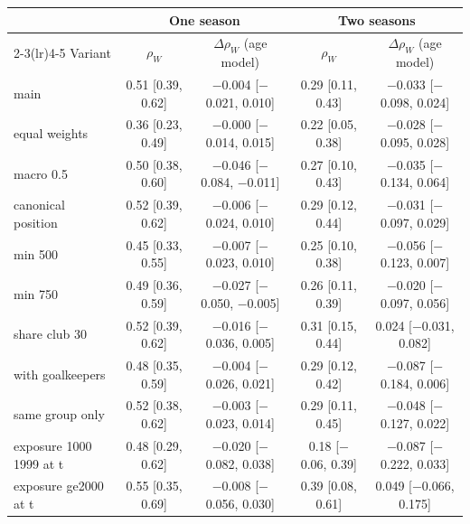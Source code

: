 \begin{tabular}{lcccc}
\toprule
 & \multicolumn{2}{c}{One season} & \multicolumn{2}{c}{Two seasons} \\
\cmidrule(lr){2-3}\cmidrule(lr){4-5}
Variant & $\rho_W$ & $\Delta\rho_W$ (age model) & $\rho_W$ & $\Delta\rho_W$ (age model) \\
\midrule
main & 0.51 [0.39, 0.62] & $-$0.004 [$-$0.021, 0.010] & 0.29 [0.11, 0.43] & $-$0.033 [$-$0.098, 0.024] \\
equal weights & 0.36 [0.23, 0.49] & $-$0.000 [$-$0.014, 0.015] & 0.22 [0.05, 0.38] & $-$0.028 [$-$0.095, 0.028] \\
macro 0.5 & 0.50 [0.38, 0.60] & $-$0.046 [$-$0.084, $-$0.011] & 0.27 [0.10, 0.43] & $-$0.035 [$-$0.134, 0.064] \\
canonical position & 0.52 [0.39, 0.62] & $-$0.006 [$-$0.024, 0.010] & 0.29 [0.12, 0.44] & $-$0.031 [$-$0.097, 0.029] \\
min 500 & 0.45 [0.33, 0.55] & $-$0.007 [$-$0.023, 0.010] & 0.25 [0.10, 0.38] & $-$0.056 [$-$0.123, 0.007] \\
min 750 & 0.49 [0.36, 0.59] & $-$0.027 [$-$0.050, $-$0.005] & 0.26 [0.11, 0.39] & $-$0.020 [$-$0.097, 0.056] \\
share club 30 & 0.52 [0.39, 0.62] & $-$0.016 [$-$0.036, 0.005] & 0.31 [0.15, 0.44] & 0.024 [$-$0.031, 0.082] \\
with goalkeepers & 0.48 [0.35, 0.59] & $-$0.004 [$-$0.026, 0.021] & 0.29 [0.12, 0.42] & $-$0.087 [$-$0.184, 0.006] \\
same group only & 0.52 [0.38, 0.62] & $-$0.003 [$-$0.023, 0.014] & 0.29 [0.11, 0.45] & $-$0.048 [$-$0.127, 0.022] \\
exposure 1000 1999 at t & 0.48 [0.29, 0.62] & $-$0.020 [$-$0.082, 0.038] & 0.18 [$-$0.06, 0.39] & $-$0.087 [$-$0.222, 0.033] \\
exposure ge2000 at t & 0.55 [0.35, 0.69] & $-$0.008 [$-$0.056, 0.030] & 0.39 [0.08, 0.61] & 0.049 [$-$0.066, 0.175] \\
\bottomrule
\end{tabular}
